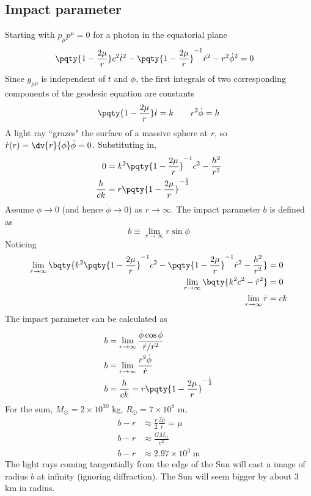 \documentclass[12pt]{article}
\begin{document}
        \subsection{Impact parameter}
        Starting with \(p_\mu p^\mu = 0\) for a photon in the equatorial plane \begin{align*}
            \pqty{1 - \frac{2\mu}{r}} c^2 \dot{t}^2 - \pqty{1 - \frac{2\mu}{r}}^{-1} \dot{r}^2 - r^2 \dot{\phi}^2 &= 0
        \end{align*}
        Since \(g_{\mu\nu}\) is independent of \(t\) and \(\phi\), the first integrals of two corresponding components of the geodesic equation are constants
        \[
            \pqty{1 - \frac{2\mu}{r}} \dot{t} = k \qquad r^2\dot{\phi} = h
        \]
        A light ray ``grazes" the surface of a massive sphere at \(r\), so \(\dot{r}(r) = \dv{r}{\phi}\dot{\phi} = 0\). Substituting in, \begin{align*}
            0 &= k^2 \pqty{1 - \frac{2\mu}{r}}^{-1} c^2 - \frac{h^2}{r^2} \\
            \frac{h}{ck} &= r \pqty{1 - \frac{2\mu}{r}}^{ -\frac{1}{2}}  
        \end{align*}
        Assume \(\phi \to 0\) (and hence \(\dot{\phi} \to 0\)) as \(r \to  \infty\). The impact parameter \(b\) is defined as \[
            b \equiv \lim_{r \to \infty}r \sin\phi
        \]
        Noticing \begin{align*}
            \lim_{r \to \infty } \bqty{k^2 \pqty{1 - \frac{2\mu}{r}}^{-1} c^2 - \pqty{1 - \frac{2\mu}{r}}^{-1} \dot{r}^2 - \frac{h^2}{r^2}} &= 0\\
            \lim_{r \to \infty } \bqty{k^2  c^2 -  \dot{r}^2 } &= 0\\
            \lim_{r \to \infty } \dot{r} &= ck
        \end{align*}
        The impact parameter can be calculated as 
        \begin{align*}
            b &= \lim_{r \to \infty} \frac{\dot{\phi}\cos\phi}{ \dot{r} / r^2} \\
            b &= \lim_{r \to \infty} \frac{r^2\dot{\phi}}{ \dot{r}} \\
            b &= \frac{h}{ ck} = r \pqty{1 - \frac{2\mu}{r}}^{ -\frac{1}{2}}  
        \end{align*}
        For the sum, \(M_\odot = 2 \times 10^{30}\) kg, \(R_\odot = 7 \times 10^8\) m, \begin{align*}
            b - r & \approx \frac{r}{2} \frac{2\mu}{r} = \mu\\
            b - r & \approx  \frac{GM_\odot}{c^2}\\
            b - r & \approx  2.97 \times 10^3 \; \mathrm{m}
        \end{align*}
        The light rays coming tangentially from the edge of the Sun will cast a image of radius \(b\) at infinity (ignoring diffraction). The Sun will seem bigger by about \(3\) km in radius.
\end{document}
